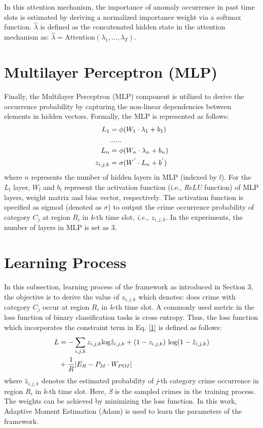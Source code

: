 In this attention mechanism, the importance of
anomaly occurrence in past time slots is estimated by deriving a normalized
importance weight via a softmax function. $\hat{\lambda}$ is defined as the concatenated hidden state in the attention mechanism as: $\hat{\lambda} = \text{Attention}(\lambda_1,...,\lambda_T)$.

\section{Multilayer Perceptron (MLP)}

Finally, the Multilayer Perceptron (MLP) component is utilized
to derive the occurrence probability by capturing the non-linear
dependencies between elements in hidden vectors. Formally, the MLP is represented as follows:
\begin{align}
            L_1 &= \phi(W_1 \cdot \lambda_1 + b_1)\notag\\
                &......\notag\\
            L_n &= \phi(W_n \cdot \lambda_n + b_n)\notag\\
            z_{i,j,k} &= \sigma(W^{'} \cdot L_n + b^{'})
\end{align}
where $n$ represents the number of hidden layers in MLP (indexed by $l$). For the $L_l$ layer, $W_l$ and $b_l$ represent the activation function
(i.e., \emph{ReLU} function) of MLP layers, weight matrix and bias vector,
respectively. The activation function is specified as sigmod (denoted as $\sigma$) to output the crime occurrence probability of category $C_j$ at region $R_i$ in \emph{k}-th time slot, \emph{i.e.,} $z_{i,j,k}$. In the experiments, the number of layers in MLP is set as 3.

\section{Learning Process}

In this subsection, learning process of the framework as introduced in Section 3, the objective is to derive the value of $z_{i,j,k}$ which denotes: does crime with category $C_j$ occur at region $R_i$ in \emph{k}-th time slot. A commonly used metric in the loss function of binary classification tasks is cross entropy. Thus, the loss function which incorporates the constraint
term in Eq. \ref{1} is defined as follows:
\begin{align}
    L   &=  - \sum_{i,j,k} z_{i,j,k} \text{log}\hat{z}_{i,j,k} + (1 - z_{i,j,k}) \text{ log}(1 - \hat{z}_{i,j,k}) \notag \\
        &+  \frac{1}{R} | E_R - P_M \cdot W_{POI} |
\end{align}
where $\hat{z}_{i,j,k}$ denotes the estimated probability of \emph{j}-th category crime occurrence in region $R_i$ in \emph{k}-th time slot. Here, \emph{S} is the sampled crimes in the training process. The weights can be achieved by minimizing the loss function. In this work, Adaptive Moment
Estimation (Adam) is used to learn the parameters of the framework.

